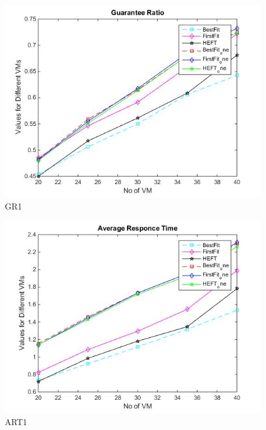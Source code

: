 \documentclass[conference]{IEEEtran}
\begin{document}
\begin{figure}[htbp]
\includegraphics[scale=0.45]{gr_1_p.jpg}
\caption{GR1}
\label{fig}
\end{figure}


\begin{figure}[htbp]
\includegraphics[scale=0.45]{art_1_p.jpg}
\caption{ART1}
\label{fig}
\end{figure}

\vspace{30pt}
\end{document}
